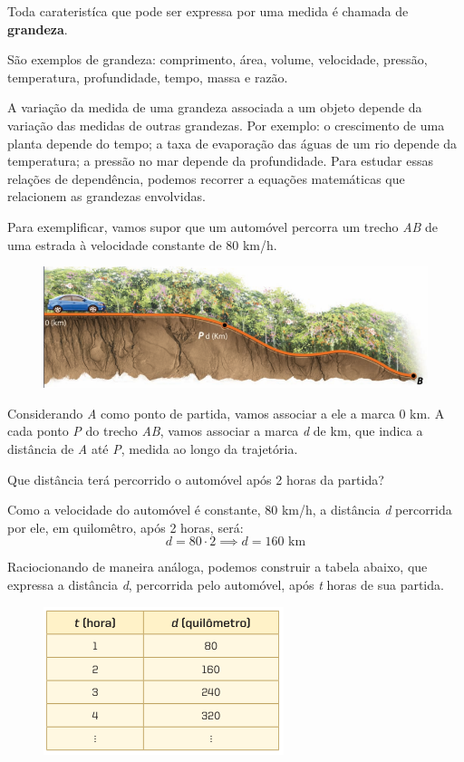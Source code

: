 Toda carateristíca que pode ser expressa por uma medida é chamada de \textbf{grandeza}.

São exemplos de grandeza: comprimento, área, volume, velocidade, pressão, temperatura, profundidade, 
tempo, massa e razão.

A variação da medida de uma grandeza associada a um objeto depende da variação das medidas  de outras 
grandezas. Por exemplo: o crescimento de uma planta depende do tempo; a taxa de evaporação das águas de um 
rio depende da temperatura; a pressão no mar depende da profundidade. Para estudar essas relações de dependência, 
podemos recorrer a equações matemáticas que relacionem as grandezas envolvidas. 

Para exemplificar, vamos supor que um automóvel percorra um trecho \textit{AB} de uma estrada à velocidade constante de 
80 km/h. 

\begin{figure}[htb!]
  \centering
  \includegraphics[width=.8\linewidth]{figures/3.png}
\end{figure}

Considerando \textit{A} como ponto de partida, vamos associar a ele a marca 0 km. A cada ponto \textit{P} do trecho \textit{AB},
vamos associar a marca \textit{d} de km, que indica a distância de \textit{A} até \textit{P}, medida ao longo da trajetória. 

Que distância terá percorrido o automóvel após 2 horas da partida?

Como a velocidade do automóvel é constante, 80 km/h, a distância \textit{d} percorrida por ele, em quilomêtro, após 2 horas, será:
\begin{equation*}
  d = 80 \cdot 2 \implies d = 160 \text{ km}
\end{equation*}

Raciocionando de maneira análoga, podemos construir a tabela abaixo, que expressa a distância \textit{d}, percorrida pelo automóvel, após \textit{t}
horas de sua partida. 

\begin{figure}[htb!]
  \centering
  \includegraphics[width=.3\linewidth]{figures/4.png}
\end{figure}

